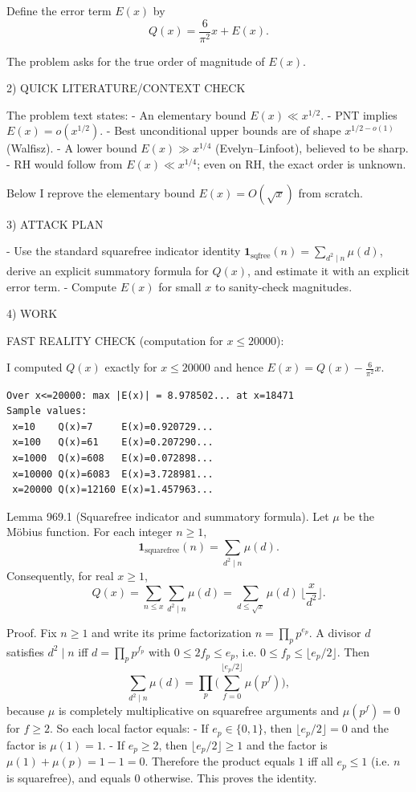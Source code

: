 Define the error term $E(x)$ by
\[
Q(x)=\frac{6}{\pi^2}x + E(x).
\]

The problem asks for the true order of magnitude of $E(x)$.

2) QUICK LITERATURE/CONTEXT CHECK

The problem text states:
- An elementary bound $E(x)\ll x^{1/2}$.
- PNT implies $E(x)=o(x^{1/2})$.
- Best unconditional upper bounds are of shape $x^{1/2-o(1)}$ (Walfisz).
- A lower bound $E(x)\gg x^{1/4}$ (Evelyn--Linfoot), believed to be sharp.
- RH would follow from $E(x)\ll x^{1/4}$; even on RH, the exact order is unknown.

Below I reprove the elementary bound $E(x)=O(\sqrt x)$ from scratch.

3) ATTACK PLAN

- Use the standard squarefree indicator identity $\mathbf 1_{\text{sqfree}}(n)=\sum_{d^2\mid n}\mu(d)$, derive an explicit summatory formula for $Q(x)$, and estimate it with an explicit error term.
- Compute $E(x)$ for small $x$ to sanity-check magnitudes.

4) WORK

FAST REALITY CHECK (computation for $x\le 20000$):

I computed $Q(x)$ exactly for $x\le 20000$ and hence $E(x)=Q(x)-\frac{6}{\pi^2}x$.

\begin{verbatim}
Over x<=20000: max |E(x)| = 8.978502... at x=18471
Sample values:
 x=10    Q(x)=7     E(x)=0.920729...
 x=100   Q(x)=61    E(x)=0.207290...
 x=1000  Q(x)=608   E(x)=0.072898...
 x=10000 Q(x)=6083  E(x)=3.728981...
 x=20000 Q(x)=12160 E(x)=1.457963...
\end{verbatim}

Lemma 969.1 (Squarefree indicator and summatory formula).
Let $\mu$ be the M\"obius function. For each integer $n\ge 1$,
\[
\mathbf 1_{\text{squarefree}}(n)=\sum_{d^2\mid n} \mu(d).
\]
Consequently, for real $x\ge 1$,
\[
Q(x)=\sum_{n\le x} \sum_{d^2\mid n}\mu(d) = \sum_{d\le \sqrt x} \mu(d)\,\Big\lfloor\frac{x}{d^2}\Big\rfloor.
\]

Proof.
Fix $n\ge 1$ and write its prime factorization $n=\prod_p p^{e_p}$.
A divisor $d$ satisfies $d^2\mid n$ iff $d=\prod_p p^{f_p}$ with $0\le 2f_p\le e_p$, i.e. $0\le f_p\le \lfloor e_p/2\rfloor$.
Then
\[
\sum_{d^2\mid n}\mu(d) = \prod_p \Big(\sum_{f=0}^{\lfloor e_p/2\rfloor} \mu(p^f)\Big),
\]
because $\mu$ is completely multiplicative on squarefree arguments and $\mu(p^f)=0$ for $f\ge 2$.
So each local factor equals:
- If $e_p\in\{0,1\}$, then $\lfloor e_p/2\rfloor=0$ and the factor is $\mu(1)=1$.
- If $e_p\ge 2$, then $\lfloor e_p/2\rfloor\ge 1$ and the factor is $\mu(1)+\mu(p)=1-1=0$.
Therefore the product equals $1$ iff all $e_p\le 1$ (i.e. $n$ is squarefree), and equals $0$ otherwise. This proves the identity.


